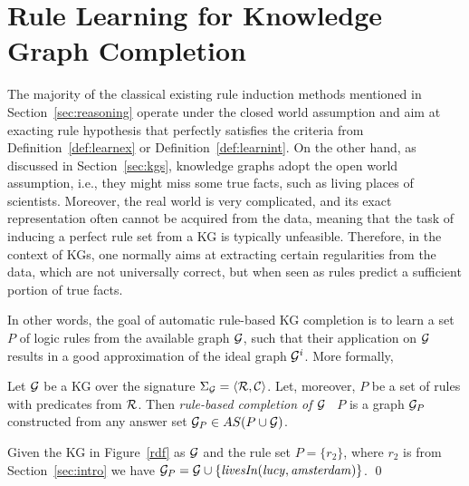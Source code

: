 \section{ Rule Learning for Knowledge Graph Completion}
\label{sec:rules_kg_completion}
The majority of the classical existing rule induction methods mentioned in Section~\ref{sec:reasoning} operate under the closed world assumption and aim at exacting rule hypothesis that perfectly satisfies the criteria from Definition~\ref{def:learnex} or Definition~\ref{def:learnint}.
On the other hand, as discussed in Section~\ref{sec:kgs}, knowledge graphs adopt the open world assumption, i.e., they might miss some true facts, such as living places of scientists. Moreover, the real world is very complicated, and its exact representation often cannot be acquired from the data, meaning that the task of inducing a perfect rule set from a KG is typically unfeasible. Therefore, in the context of KGs, one normally aims at extracting certain regularities from the data, which are not universally correct, but when seen as rules predict a sufficient portion of true facts. 

In other words, the goal of automatic rule-based KG completion is to learn a set $P$ of logic rules from the available graph $\mathcal{G}$, such that their application on $\mathcal{G}$ results in a good approximation of the ideal graph $\mathcal{G}^i$. More formally,



 \begin{definition}\label{def:kgcomp} Let $\mathcal{G}$ be a KG  over the signature $\Sigma_{\mathcal{G}}=\langle\mathcal{R},\mathcal{C}\rangle$. Let, moreover, $P$ be a set of rules with predicates from $\mathcal{R}$. 
 Then \emph{rule-based completion of $\mathcal{G}$ \wrt\ $P$} is a graph $\mathcal{G}_{P}$ constructed from any answer set $\mathcal{G}_{P}\in AS(P \cup \mathcal{G})$. 
 \end{definition}
 
 \begin{example}
 Given the KG in Figure~\ref{rdf} as $\mathcal{G}$ and the rule set $P=\{r_2\}$, where $r_2$ is from Section~\ref{sec:intro} 
 we have $\mathcal{G}_{P}=\mathcal{G} \cup \{\mathit{livesIn(lucy,amsterdam)}\}$. \qed
 \end{example}

